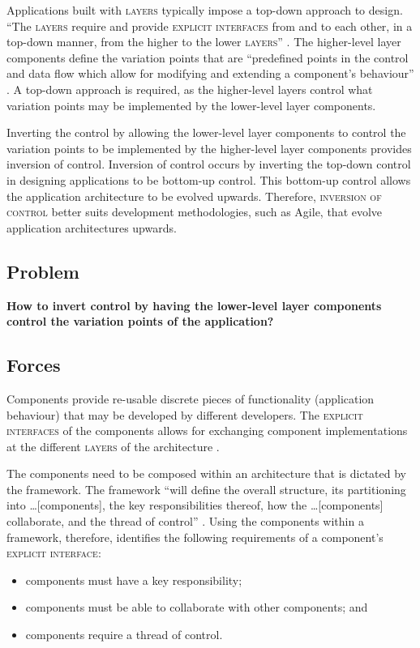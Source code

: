 \documentclass[prodmode]{style/acmlarge}
\begin{document}
Applications built with \textsc{layers} typically impose a top-down approach to
design.  ``The \textsc{layers} require and provide \textsc{explicit interfaces}
from and to each other, in a top-down manner, from the higher to the lower
\textsc{layers}'' \cite[p. 11]{ioc}.  The higher-level layer components define
the variation points that are ``predefined points in the control and data flow
which allow for modifying and extending a component's behaviour'' \cite[p.
5]{ioc}.  A top-down approach is required, as the higher-level layers control
what variation points may be implemented by the lower-level layer components.

Inverting the control by allowing the lower-level layer components to control the
variation points to be implemented by the higher-level layer components provides
inversion of control.  Inversion of control occurs by inverting the top-down
control in designing applications to be bottom-up control.  This bottom-up
control allows the application architecture to be evolved upwards. Therefore,
\textsc{inversion of control} better suits development methodologies, such as
Agile, that evolve application architectures upwards.


\subsection{Problem}

\textbf{How to invert control by having the lower-level layer components control the variation points of the application?}


\subsection{Forces}

Components provide re-usable discrete pieces of functionality (application
behaviour) that may be developed by different developers.  The \textsc{explicit
interfaces} of the components allows for exchanging component implementations at
the different \textsc{layers} of the architecture \cite{ioc}.

The components need to be composed within an architecture that is dictated by
the framework.  The framework ``will define the overall structure, its
partitioning into \ldots [components], the key responsibilities thereof, how the
\ldots [components] collaborate, and the thread of control'' \cite[p.26]{gof}.
Using the components within a framework, therefore, identifies the following
requirements of a component's \textsc{explicit interface}:
\begin{itemize}
  \item components must have a key responsibility;
  \item components must be able to collaborate with other components; and
  \item components require a thread of control.
\end{itemize}
\end{document}
